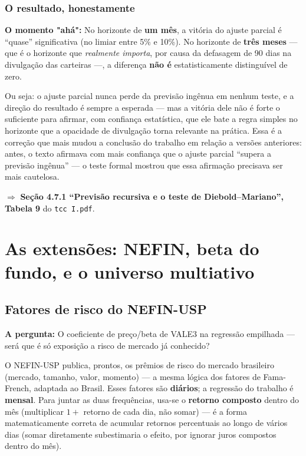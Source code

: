 \documentclass[11pt,a4paper]{article}
\newcommand{\pergunta}[1]{\par\vspace{4pt}\noindent\textbf{\color{azul}A pergunta:} #1\par\vspace{2pt}}
\newcommand{\aha}[1]{\par\vspace{4pt}\noindent\textbf{\color{vermelho}O momento "ahá":} #1\par\vspace{2pt}}
\begin{document}
\subsubsection*{O resultado, honestamente}

\aha{No horizonte de \textbf{um mês}, a vitória do ajuste parcial é ``quase'' significativa (no
limiar entre 5\% e 10\%). No horizonte de \textbf{três meses} --- que é o horizonte que
\emph{realmente importa}, por causa da defasagem de 90 dias na divulgação das carteiras ---, a
diferença \textbf{não é} estatisticamente distinguível de zero.}

Ou seja: o ajuste parcial nunca perde da previsão ingênua em nenhum teste, e a direção do
resultado é sempre a esperada --- mas a vitória dele não é forte o suficiente para afirmar, com
confiança estatística, que ele bate a regra simples no horizonte que a opacidade de divulgação
torna relevante na prática. Essa é a correção que mais mudou a conclusão do trabalho em relação a
versões anteriores: antes, o texto afirmava com mais confiança que o ajuste parcial ``supera a
previsão ingênua'' --- o teste formal mostrou que essa afirmação precisava ser mais cautelosa.

$\Rightarrow$ \textbf{Seção 4.7.1 ``Previsão recursiva e o teste de Diebold--Mariano'', Tabela 9}
do \texttt{tcc I.pdf}.

\section{As extensões: NEFIN, beta do fundo, e o universo multiativo}

\subsection{Fatores de risco do NEFIN-USP}

\pergunta{O coeficiente de preço/beta de VALE3 na regressão empilhada --- será que é só
exposição a risco de mercado já conhecido?}

O NEFIN-USP publica, prontos, os prêmios de risco do mercado brasileiro (mercado, tamanho,
valor, momento) --- a mesma lógica dos fatores de Fama-French, adaptada ao Brasil. Esses fatores
são \textbf{diários}; a regressão do trabalho é \textbf{mensal}. Para juntar as duas frequências,
usa-se o \textbf{retorno composto} dentro do mês (multiplicar $1+$ retorno de cada dia, não
somar) --- é a forma matematicamente correta de acumular retornos percentuais ao longo de vários
dias (somar diretamente subestimaria o efeito, por ignorar juros compostos dentro do mês).
\end{document}
